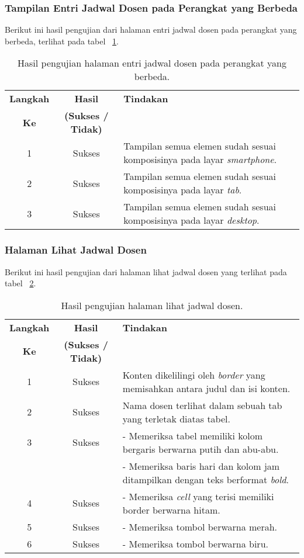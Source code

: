 \subsubsection{Tampilan Entri Jadwal Dosen pada Perangkat yang Berbeda}
Berikut ini hasil pengujian dari halaman entri jadwal dosen pada perangkat yang berbeda, terlihat pada tabel ~\ref{hasil:EntriJadwalDosenDevices}.
\begin{table}[H]
	\centering 
	\caption{Hasil pengujian halaman entri jadwal dosen pada perangkat yang berbeda.}
	\label{hasil:EntriJadwalDosenDevices}
	\begin{tabular}{|c|c|p{}|}
		\toprule
		\textbf{Langkah} & \textbf{Hasil} & \textbf{Tindakan}\\
		\textbf{Ke} & \textbf{(Sukses / Tidak)} & \\		
		\midrule
		1 & Sukses & Tampilan semua elemen sudah sesuai komposisinya pada layar \textit{smartphone}.\\
		\hline
		2 & Sukses & Tampilan semua elemen sudah sesuai komposisinya pada layar \textit{tab}.\\
		\hline
		3 & Sukses & Tampilan semua elemen sudah sesuai komposisinya pada layar \textit{desktop}.\\
		\hline
		\bottomrule		
	\end{tabular} 
\end{table}


\subsubsection{Halaman Lihat Jadwal Dosen}
Berikut ini hasil pengujian dari halaman lihat jadwal dosen yang terlihat pada tabel ~\ref{hasil:LihatJadwal}.
\begin{table}[H]
	\centering 
	\caption{Hasil pengujian halaman lihat jadwal dosen.}
	\label{hasil:LihatJadwal}
	\begin{tabular}{|c| c| p{}|}
		\toprule
		\textbf{Langkah} & \textbf{Hasil} & \textbf{Tindakan}\\
		\textbf{Ke} & \textbf{(Sukses / Tidak)} &\\
		\midrule
		1&Sukses&Konten dikelilingi oleh \textit{border} yang memisahkan antara judul dan isi konten.\\
		\hline
		2&Sukses& Nama dosen terlihat dalam sebuah tab yang terletak diatas tabel.\\
		\hline
		3&Sukses&- Memeriksa tabel memiliki kolom bergaris berwarna putih dan abu-abu.\\
		&& - Memeriksa baris hari dan kolom jam ditampilkan dengan teks berformat \textit{bold}.	\\	
		\hline
		4&Sukses&- Memeriksa \textit{cell} yang terisi memiliki border berwarna hitam.\\		
		\hline
		5&Sukses&- Memeriksa tombol berwarna merah.\\
		\hline
		6& Sukses & - Memeriksa tombol berwarna biru.\\
		\bottomrule		
	\end{tabular} 
\end{table}

